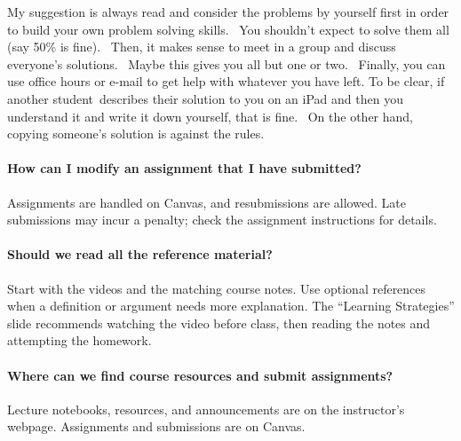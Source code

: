 \documentclass[10pt,english]{article}
\begin{document}
My suggestion is always read and consider the problems by yourself first in order to build your own problem solving skills.  You shouldn't expect to solve them all (say 50\% is fine).  Then, it makes sense to meet in a group and discuss everyone's solutions.  Maybe this gives you all but one or two.  Finally, you can use office hours or e-mail to get help with whatever you have left.  To be clear, if another student describes their solution to you on an iPad and then you understand it and write it down yourself, that is fine.  On the other hand, copying someone's solution is against the rules.


\paragraph{How can I modify an assignment that I have submitted?}

Assignments are handled on Canvas, and resubmissions are allowed.
Late submissions may incur a penalty; check the assignment instructions for details.


\paragraph{Should we read all the reference material?}
Start with the videos and the matching course notes.
Use optional references when a definition or argument needs more explanation.
The ``Learning Strategies'' slide recommends watching the video before class, then reading the notes and attempting the homework.

\paragraph{Where can we find course resources and submit assignments?}
Lecture notebooks, resources, and announcements are on the instructor's webpage.
Assignments and submissions are on Canvas.
\end{document}
